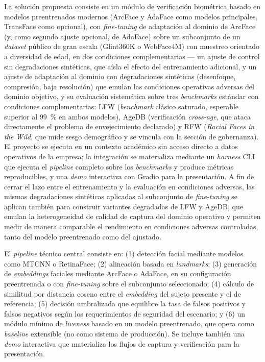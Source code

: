 \documentclass[
  11pt, %
]{charter}
\begin{document}
La solución propuesta consiste en un módulo de verificación biométrica basado en modelos preentrenados modernos (ArcFace y AdaFace como modelos principales, TransFace como opcional), con \textit{fine-tuning} de adaptación al dominio de ArcFace (y, como segundo ajuste opcional, de AdaFace) sobre un subconjunto de un \textit{dataset} público de gran escala (Glint360K o WebFace4M) con muestreo orientado a diversidad de edad, en dos condiciones complementarias --- un ajuste de control sin degradaciones sintéticas, que aísla el efecto del entrenamiento adicional, y un ajuste de adaptación al dominio con degradaciones sintéticas (desenfoque, compresión, baja resolución) que emulan las condiciones operativas adversas del dominio objetivo, y su evaluación sistemática sobre tres \textit{benchmarks} estándar con condiciones complementarias: LFW (\textit{benchmark} clásico saturado, esperable superior al 99~\% en ambos modelos), AgeDB (verificación \textit{cross-age}, que ataca directamente el problema de envejecimiento declarado) y RFW (\textit{Racial Faces in the Wild}, que mide sesgo demográfico y se vincula con la sección de gobernanza). El proyecto se ejecuta en un contexto académico sin acceso directo a datos operativos de la empresa; la integración se materializa mediante un \textit{harness} CLI que ejecuta el \textit{pipeline} completo sobre los \textit{benchmarks} y produce métricas reproducibles, y una \textit{demo} interactiva con Gradio para la presentación. A fin de cerrar el lazo entre el entrenamiento y la evaluación en condiciones adversas, las mismas degradaciones sintéticas aplicadas al subconjunto de \textit{fine-tuning} se aplican también para construir variantes degradadas de LFW y AgeDB, que emulan la heterogeneidad de calidad de captura del dominio operativo y permiten medir de manera comparable el rendimiento en condiciones adversas controladas, tanto del modelo preentrenado como del ajustado.

El \textit{pipeline} técnico central consiste en: (1) detección facial mediante modelos como MTCNN o RetinaFace; (2) alineación basada en \textit{landmarks}; (3) generación de \textit{embeddings} faciales mediante ArcFace o AdaFace, en su configuración preentrenada o con \textit{fine-tuning} sobre el subconjunto seleccionado; (4) cálculo de similitud por distancia coseno entre el \textit{embedding} del sujeto presente y el de referencia; (5) decisión umbralizada que equilibre la tasa de falsos positivos y falsos negativos según los requerimientos de seguridad del escenario; y (6) un módulo mínimo de \textit{liveness} basado en un modelo preentrenado, que opera como \textit{baseline} extensible (no como sistema de producción). Se incluye también una \textit{demo} interactiva que materializa los flujos de captura y verificación para la presentación.
\end{document}
